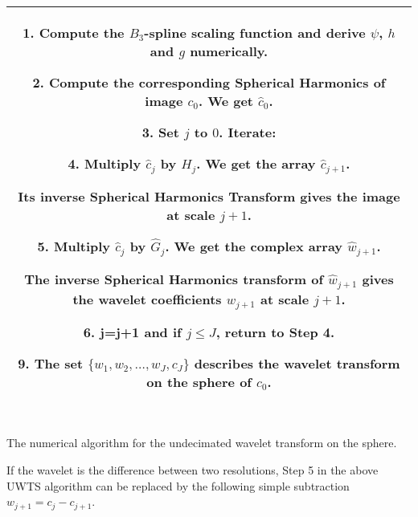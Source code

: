 \begin{center}
\begin{tabular}{|c|} \hline
\begin{minipage}[b]{5.3in}
\vspace{0.1in}

\small{
\textsf{1. Compute the $B_3$-spline scaling function and derive $\psi$, $h$ and $g$ numerically.}

\textsf{2. Compute the corresponding Spherical Harmonics of image $c_0$. We get ${\hat c}_0$.}

\textsf{3. Set $j$ to $0$. Iterate:}

\hspace{0.3in} \textsf{4. Multiply  $\hat{c}_j$ by $\widehat H_{j}$. We get the array $\hat{c}_{j+1}$.}

\hspace{0.33in} \textsf{Its inverse Spherical Harmonics Transform gives the image at scale $j+1$.}

\hspace{0.3in} \textsf{5. Multiply $\hat{c}_j$ by $\widehat G_{j}$. We get the complex array
$\hat{w}_{j+1}$.}

\hspace{0.33in} \textsf{ The inverse Spherical Harmonics transform of $\hat{w}_{j+1}$ 
gives the wavelet coefficients $w_{j+1}$ at scale $j+1$.}

\hspace{0.3in} \textsf{6. j=j+1 and if $j \leq  J$, return to Step 4.}

\textsf{9. The set $\{w_1, w_2, \dots, w_{J}, c_{J}\}$ describes the wavelet transform on the sphere of $c_0$.}}

\vspace{0.05in}
\end{minipage}
\\\hline
\end{tabular}
\\ \vspace{0.1in}
The numerical algorithm for the undecimated wavelet transform on the sphere.
\end{center}
\linespread{1.3}

If the wavelet is the difference between two resolutions, Step 5 in the above UWTS algorithm can be replaced by the following simple subtraction $w_{j+1} = c_{j} - c_{j+1}$.

